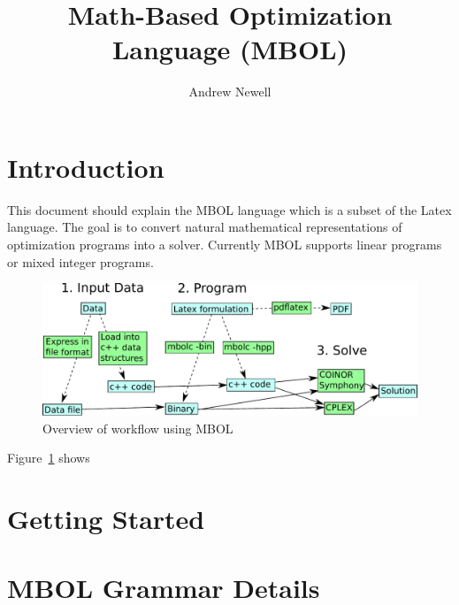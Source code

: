 \documentclass{article}
\begin{document}
\title{Math-Based Optimization Language (MBOL)}

\author{Andrew Newell}

\maketitle

\tableofcontents

\section{Introduction}

This document should explain the MBOL language which is a subset of the Latex language. The goal is to convert natural mathematical representations of optimization programs into a solver. Currently MBOL supports linear programs or mixed integer programs.

\begin{figure}
\includegraphics[width=\textwidth]{figures/mbol-overview.pdf}
\caption{Overview of workflow using MBOL}
\label{lab:overview}
\end{figure}

Figure~\ref{lab:overview} shows 

\section{Getting Started}

\section{MBOL Grammar Details}
\end{document}
